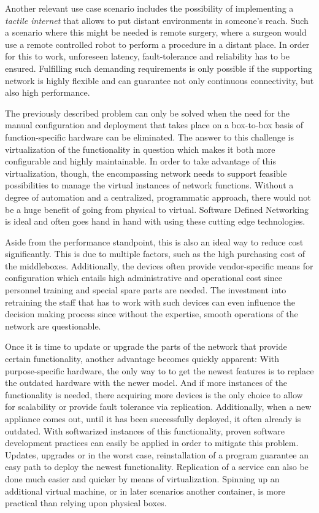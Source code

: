 Another relevant use case scenario includes the possibility of implementing a \textit{tactile internet} that allows to put distant environments in someone's reach. Such a scenario where this might be needed is remote surgery, where a surgeon would use a remote controlled robot to perform a procedure in a distant place. In order for this to work, unforeseen latency, fault-tolerance and reliability has to be ensured. Fulfilling such demanding requirements is only possible if the supporting network is highly flexible and can guarantee not only continuous connectivity, but also high performance. 

The previously described problem can only be solved when the need for the manual configuration and deployment that takes place on a box-to-box basis of function-specific hardware can be eliminated. The answer to this challenge is virtualization of the functionality in question which makes it both more configurable and highly maintainable. In order to take advantage of this virtualization, though, the encompassing network needs to support feasible possibilities to manage the virtual instances of network functions. Without a degree of automation and a centralized, programmatic approach, there would not be a huge benefit of going from physical to virtual. Software Defined Networking is ideal and often goes hand in hand with using these cutting edge technologies.

Aside from the performance standpoint, this is also an ideal way to reduce cost significantly. This is due to multiple factors, such as the high purchasing cost of the middleboxes. Additionally, the devices often provide vendor-specific means for configuration which entails high administrative and operational cost since personnel training and special spare parts are needed.  The investment into retraining the staff that has to work with such devices can even influence the decision making process since without the expertise, smooth operations of the network are questionable. 

Once it is time to update or upgrade the parts of the network that provide certain functionality, another advantage becomes quickly apparent: With purpose-specific hardware, the only way to to get the newest features is to replace the outdated hardware with the newer model. And if more instances of the functionality is needed, there acquiring more devices is the only choice to allow for scalability or provide fault tolerance via replication. Additionally, when a new appliance comes out, until it has been successfully deployed, it often already is outdated. With softwarized instances of this functionality, proven software development practices can easily be applied in order to mitigate this problem. Updates, upgrades or in the worst case, reinstallation of a program guarantee an easy path to deploy the newest functionality. Replication of a service can also be done much easier and quicker by means of virtualization. Spinning up an additional virtual machine, or in later scenarios another container, is more practical than relying upon physical boxes. 

